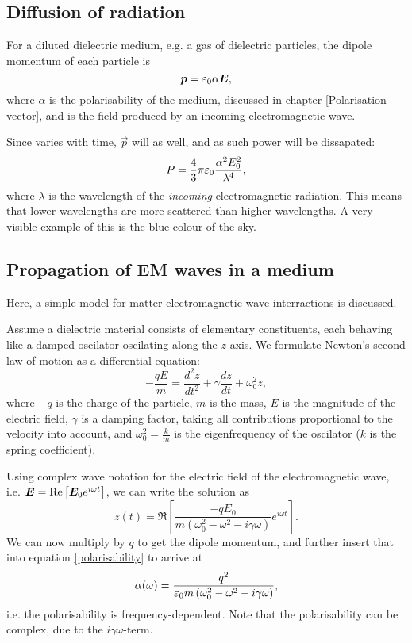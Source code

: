 \subsection{Diffusion of radiation}

    For a diluted dielectric medium, e.g. a gas of dielectric particles, the dipole momentum of each particle is 
    \begin{equation}
        \bm{p} = \varepsilon_0\alpha\bm{E},
    \end{equation}
    where $\alpha$ is the polarisability of the medium, discussed in chapter \ref{Polarisation vector}, 
    and \E{} is the field produced by an incoming electromagnetic wave. 

    Since \E{} varies with time, $\vec{p}$ will as well, and as such power will be dissapated: 
    \begin{equation}
        P = \frac{4}{3}\pi\varepsilon_0\frac{\alpha^2 E_0^2}{\lambda^4},
    \end{equation}
    where $\lambda$ is the wavelength of the \textit{incoming} electromagnetic radiation. 
    This means that lower wavelengths are more scattered than higher wavelengths. 
    A very visible example of this is the blue colour of the sky.

\subsection{Propagation of EM waves in a medium}
    Here, a simple model for matter-electromagnetic wave-interractions is discussed. 

    Assume a dielectric material consists of elementary constituents, 
    each behaving like a damped oscilator oscilating along the $z$-axis.
    We formulate Newton's second law of motion as a differential equation: 
    \begin{equation*}
        -\frac{qE}{m} = \frac{d^2z}{dt^2} + \gamma\frac{dz}{dt} + \omega_0^2z,
    \end{equation*}
    where $-q$ is the charge of the particle, $m$ is the mass, $E$ is the magnitude of the electric field, 
    $\gamma$ is a damping factor, taking all contributions proportional to the velocity into account, 
    and $\omega_0^2 = \frac{k}{m}$ is the eigenfrequency of the oscilator ($k$ is the spring coefficient).

    Using complex wave notation for the electric field of the electromagnetic wave, 
    i.e. $\bm{E} = \Re\left[\bm{E}_0 e^{i\omega t}\right]$, we can write the solution as 
    \begin{equation}
        z(t) = \Re\left[\frac{-qE_0}{m\left(\omega_0^2 - \omega^2-i\gamma\omega\right)}e^{i\omega t}\right].
    \end{equation}
    We can now multiply by $q$ to get the dipole momentum, and further insert that into equation \eqref{polarisability} to arrive at
    \begin{equation}
        \alpha(\omega) = \frac{q^2}{\varepsilon_0 m\left(\omega_0^2 - \omega^2 - i\gamma\omega\right)},
    \end{equation}
    i.e. the polarisability is frequency-dependent. Note that the polarisability can be complex, due to the $i\gamma\omega$-term.


